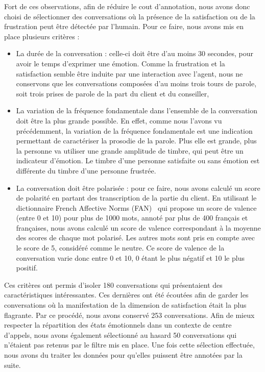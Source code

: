 Fort de ces observations, afin de réduire le cout d'annotation, nous avons donc choisi de sélectionner des conversations où la présence de la satisfaction ou de la frustration peut être détectée par l'humain. Pour ce faire, nous avons mis en place plusieurs critères :
\begin{itemize}
  \item La durée de la conversation : celle-ci doit être d'au moins 30 secondes, pour avoir le temps d'exprimer une émotion. Comme la frustration et la satisfaction semble être induite par une interaction avec l'agent, nous ne conservons que les conversations composées d'au moins trois tours de parole, soit trois prises de parole de la part du client et du conseiller,
  \item La variation de la fréquence fondamentale dans l'ensemble de la conversation doit être la plus grande possible. En effet, comme nous l'avons vu précédemment, la variation de la fréquence fondamentale est une indication permettant de caractériser la prosodie de la parole. Plus elle est grande, plus la personne va utiliser une grande amplitude de timbre, qui peut être un indicateur d'émotion. Le timbre d'une personne satisfaite ou sans émotion est différente du timbre d'une personne frustrée.
  \item La conversation doit être polarisée : pour ce faire, nous avons calculé un score de polarité en partant des transcription de la partie du client. En utilisant le dictionnaire French Affective Norms (FAN)~\cite{Monnier2014} qui propose un score de valence (entre 0 et 10) pour plus de 1000 mots, annoté par plus de 400 français et françaises, nous avons calculé un score de valence correspondant à la moyenne des scores de chaque mot polarisé. Les autres mots sont pris en compte avec le score de 5, considéré comme le neutre. Ce score de valence de la conversation varie donc entre 0 et 10, 0 étant le plus négatif et 10 le plus positif.
\end{itemize}
Ces critères ont permis d'isoler 180 conversations qui présentaient des caractéristiques intéressantes. Ces dernières ont été écoutées afin de garder les conversations où la manifestation de la dimension de satisfaction était la plus flagrante. Par ce procédé, nous avons conservé 253 conversations.
Afin de mieux respecter la répartition des états émotionnels dans un contexte de centre d'appels, nous avons également sélectionné au hasard 50 conversations qui n'étaient pas retenus par le filtre mis en place.
Une fois cette sélection effectuée, nous avons du traiter les données pour qu'elles puissent être annotées par la suite.

